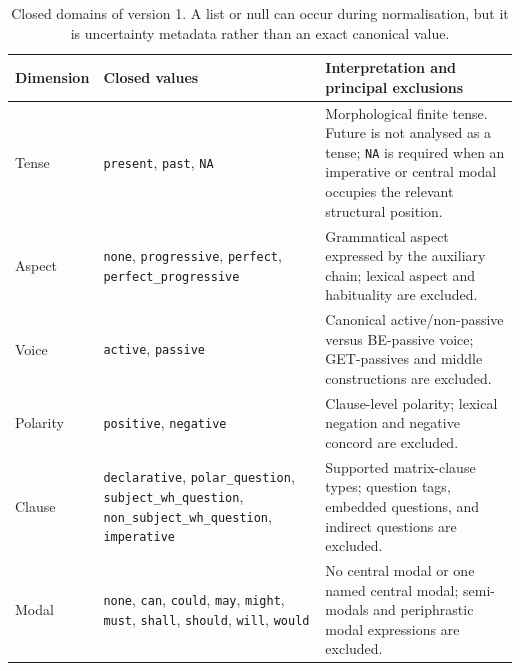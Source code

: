 \begin{table}[t]
  \centering
  \small
  \begin{tabularx}{\textwidth}{@{}
    >{\raggedright\arraybackslash}p{}
    >{\raggedright\arraybackslash}p{}
    >{\raggedright\arraybackslash}X@{}}
    \toprule
    Dimension & Closed values & Interpretation and principal exclusions \\
    \midrule
    Tense & \texttt{present}, \texttt{past}, \texttt{NA}
      & Morphological finite tense.  Future is not analysed as a tense;
        \texttt{NA} is required when an imperative or central modal occupies
        the relevant structural position. \\
    Aspect & \texttt{none}, \texttt{progressive}, \texttt{perfect},
      \texttt{perfect\_progressive}
      & Grammatical aspect expressed by the auxiliary chain; lexical aspect
        and habituality are excluded. \\
    Voice & \texttt{active}, \texttt{passive}
      & Canonical active/non-passive versus BE-passive voice; GET-passives and
        middle constructions are excluded. \\
    Polarity & \texttt{positive}, \texttt{negative}
      & Clause-level polarity; lexical negation and negative concord are
        excluded. \\
    Clause & \texttt{declarative}, \texttt{polar\_question},
      \texttt{subject\_wh\_question}, \texttt{non\_subject\_wh\_question},
      \texttt{imperative}
      & Supported matrix-clause types; question tags, embedded questions, and
        indirect questions are excluded. \\
    Modal & \texttt{none}, \texttt{can}, \texttt{could}, \texttt{may},
      \texttt{might}, \texttt{must}, \texttt{shall}, \texttt{should},
      \texttt{will}, \texttt{would}
      & No central modal or one named central modal; semi-modals and
        periphrastic modal expressions are excluded. \\
    \bottomrule
  \end{tabularx}
  \caption{Closed domains of \grammarcell version 1.  A list or null can occur
  during normalisation, but it is uncertainty metadata rather than an exact
  canonical value.}
  \label{tab:grammar-dimensions}
\end{table}
